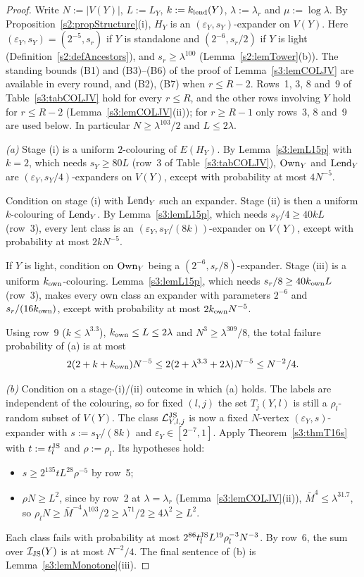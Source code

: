 \begin{proof}
Write $N:=|V(Y)|$, $L:=L_Y$, $k:=k_{\mathrm{lend}}(Y)$, $\lambda:=\lambda_r$ and
$\mu:=\log\lambda$. By Proposition~\ref{s2:propStructure}(i),
$H_Y$ is an $(\varepsilon_Y,s_Y)$-expander on $V(Y)$. Here
$(\varepsilon_Y,s_Y)=(2^{-5},s_r)$ if $Y$ is standalone and
$(2^{-6},s_r/2)$ if $Y$ is light
(Definition~\ref{s2:defAncestors}), and $s_r\ge\lambda^{100}$
(Lemma~\ref{s2:lemTower}(b)). The standing bounds (B1) and (B3)--(B6) of
the proof of Lemma~\ref{s3:lemCOLJV} are available in every round, and
(B2), (B7) when $r\le R-2$. Rows~1, 3, 8 and~9 of
Table~\ref{s3:tabCOLJV} hold for every $r\le R$, and the other rows
involving $Y$ hold for $r\le R-2$ (Lemma~\ref{s3:lemCOLJV}(ii)); for
$r\ge R-1$ only rows~3, 8 and~9 are used below. In particular
$N\ge\lambda^{103}/2$ and $L\le2\lambda$.

\emph{(a)} Stage (i) is a uniform $2$-colouring of $E(H_Y)$. By
Lemma~\ref{s3:lemL15p} with $k=2$, which needs $s_Y\ge80L$ (row~3 of
Table~\ref{s3:tabCOLJV}), $\mathrm{Own}_Y$ and $\mathrm{Lend}_Y$ are
$(\varepsilon_Y,s_Y/4)$-expanders on $V(Y)$, except with probability at
most $4N^{-5}$.

Condition on stage (i) with $\mathrm{Lend}_Y$ such an expander. Stage (ii) is
then a uniform $k$-colouring of $\mathrm{Lend}_Y$. By Lemma~\ref{s3:lemL15p},
which needs $s_Y/4\ge40kL$ (row~3), every lent class is an
$(\varepsilon_Y,s_Y/(8k))$-expander on $V(Y)$, except with probability
at most $2kN^{-5}$.

If $Y$ is light, condition on $\mathrm{Own}_Y$ being a
$(2^{-6},s_r/8)$-expander. Stage (iii) is a uniform $k_{\mathrm{own}}$-colouring.
Lemma~\ref{s3:lemL15p}, which needs $s_r/8\ge40k_{\mathrm{own}} L$ (row~3), makes
every own class an expander with parameters $2^{-6}$ and
$s_r/(16k_{\mathrm{own}})$, except with probability at most $2k_{\mathrm{own}} N^{-5}$.

Using row~9 ($k\le\lambda^{3.3}$), $k_{\mathrm{own}}\le L\le2\lambda$ and
$N^3\ge\lambda^{309}/8$, the total failure probability of (a) is at most
\[
2(2+k+k_{\mathrm{own}})N^{-5}\le2(2+\lambda^{3.3}+2\lambda)N^{-5}\le N^{-2}/4 .
\]

\emph{(b)} Condition on a stage-(i)/(ii) outcome in which (a) holds. The
labels are independent of the colouring, so for fixed $(l,j)$ the set
$T_j(Y,l)$ is still a $\rho_l$-random subset of $V(Y)$. The class
$\mathcal{L}^{\mathrm{JS}}_{Y,l,j}$ is now a fixed $N$-vertex $(\varepsilon_Y,s)$-expander
with $s:=s_Y/(8k)$ and $\varepsilon_Y\in[2^{-7},1]$. Apply
Theorem~\ref{s3:thmT16s} with $t:=t^{\mathrm{JS}}_l$ and $\rho:=\rho_l$. Its
hypotheses hold:
\begin{itemize}
\item $s\ge2^{135}tL^{28}\rho^{-5}$ by row~5;
\item $\rho N\ge L^2$, since by row~2 at $\lambda=\lambda_r$
  (Lemma~\ref{s3:lemCOLJV}(ii)), $\bar M^4\le\lambda^{31.7}$, so
  $\rho_lN\ge\bar M^{-4}\lambda^{103}/2\ge\lambda^{71}/2\ge4\lambda^2\ge L^2$.
\end{itemize}
Each class fails with probability at most
$2^{86}t^{\mathrm{JS}}_lL^{19}\rho_l^{-3}N^{-3}$. By row~6, the sum over $\mathcal{I}_{\mathrm{JS}}(Y)$
is at most $N^{-2}/4$. The final sentence of (b) is
Lemma~\ref{s3:lemMonotone}(iii).


\end{proof}
